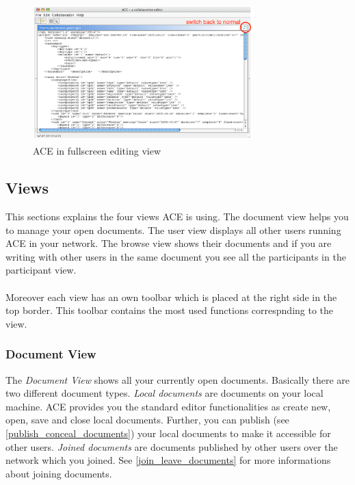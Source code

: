 \documentclass[11pt,a4paper]{article}
\begin{document}
\begin{figure}[H]
\begin{center}
  \includegraphics[height= 2.09in, width=3.34in]{../images/usermanual/g_editor_fullscreen.eps}
\caption{ACE in fullscreen editing view}
\label{ace_editor_full}
\end{center}
\end{figure}

\subsection{Views}
This sections explains the four views ACE is using. The document view helps you to manage your open documents. The user view displays all other users running ACE in your network. The browse view shows their documents and if you are writing with other users in the same document you see all the participants in the participant view. \\
\\
Moreover each view has an own toolbar which is placed at the right side in the top border. This toolbar contains the most used functions correspnding to the view.


\subsubsection{Document View}
The \textit{Document View} shows all your currently open documents. Basically there are two different document types. \textit{Local documents} are documents on your local machine. ACE provides you the standard editor functionalities as create new, open, save and close local documents. Further, you can publish (see \ref{publish_conceal_documents}) your local documents to make it accessible for other users. \textit{Joined documents} are documents published by other users over the network which you joined. See \ref{join_leave_documents} for more informations about joining documents. \\
\end{document}
